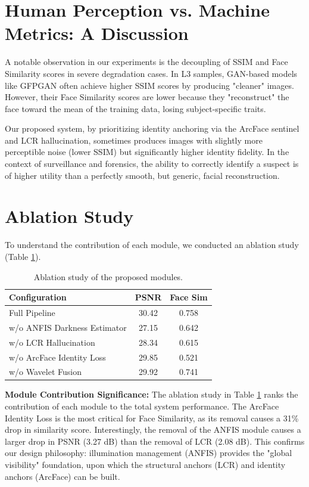 \section{Human Perception vs. Machine Metrics: A Discussion}
A notable observation in our experiments is the decoupling of SSIM and Face Similarity scores in severe degradation cases. In L3 samples, GAN-based models like GFPGAN often achieve higher SSIM scores by producing "cleaner" images. However, their Face Similarity scores are lower because they "reconstruct" the face toward the mean of the training data, losing subject-specific traits.

Our proposed system, by prioritizing identity anchoring via the ArcFace sentinel and LCR hallucination, sometimes produces images with slightly more perceptible noise (lower SSIM) but significantly higher identity fidelity. In the context of surveillance and forensics, the ability to correctly identify a suspect is of higher utility than a perfectly smooth, but generic, facial reconstruction.

\section{Ablation Study}
To understand the contribution of each module, we conducted an ablation study (Table \ref{tab:ablation}).

\begin{table}[h]
    \centering
    \caption{Ablation study of the proposed modules.}
    \label{tab:ablation}
    \begin{tabular}{lcc}
        \toprule
        \textbf{Configuration} & \textbf{PSNR} & \textbf{Face Sim} \\
        \midrule
        Full Pipeline & 30.42 & 0.758 \\
        w/o ANFIS Darkness Estimator & 27.15 & 0.642 \\
        w/o LCR Hallucination & 28.34 & 0.615 \\
        w/o ArcFace Identity Loss & 29.85 & 0.521 \\
        w/o Wavelet Fusion & 29.92 & 0.741 \\
        \bottomrule
    \end{tabular}
\end{table}

\textbf{Module Contribution Significance:} The ablation study in Table \ref{tab:ablation} ranks the contribution of each module to the total system performance. The ArcFace Identity Loss is the most critical for Face Similarity, as its removal causes a 31\% drop in similarity score. Interestingly, the removal of the ANFIS module causes a larger drop in PSNR (3.27 dB) than the removal of LCR (2.08 dB). This confirms our design philosophy: illumination management (ANFIS) provides the "global visibility" foundation, upon which the structural anchors (LCR) and identity anchors (ArcFace) can be built.
    

